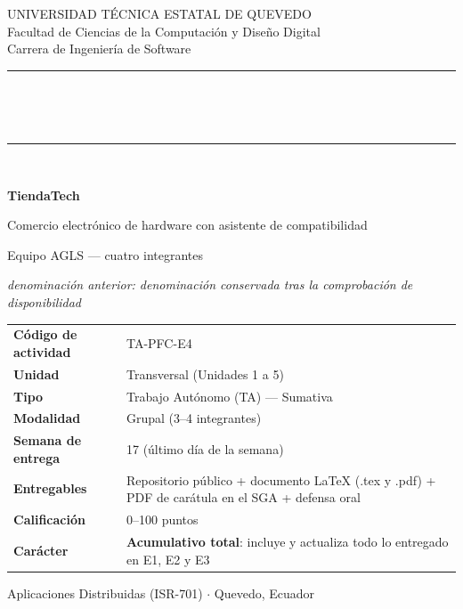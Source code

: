\documentclass[11pt,a4paper]{article}
\begin{document}
	
	\begin{titlepage}
		\centering
		\vspace*{0.9cm}
		{\small\color{uteqGray} UNIVERSIDAD TÉCNICA ESTATAL DE QUEVEDO\\ Facultad de Ciencias de la Computación y Diseño Digital\\ Carrera de Ingeniería de Software\par}
		\vspace{16pt}
		{\color{uteqBlue}\rule{\textwidth}{2pt}}\\[8pt]
		\colorbox{uteqBlue}{\parbox{0.96\textwidth}{\centering{}\vspace{5pt}}}\\[8pt]
		{\color{uteqBlue}\rule{\textwidth}{2pt}}\\[18pt]
		{\LARGE\bfseries\color{uteqBlue} TiendaTech\par}
		\vspace{5pt}
		{\large\color{uteqGray} Comercio electrónico de hardware con asistente de compatibilidad\par}
		\vspace{4pt}
		{\normalsize\color{uteqGray} Equipo AGLS --- cuatro integrantes\par}
		\vspace{3pt}
		{\footnotesize\color{uteqGray}\emph{denominación anterior: denominación conservada tras la comprobación de disponibilidad}\par}
		\vspace{22pt}
		\begin{minipage}{0.92\textwidth}
			\small
			\begin{tabular}{@{}p{4.3cm}p{9.6cm}@{}}
				\toprule
				\textbf{Código de actividad} & TA-PFC-E4 \\
				\textbf{Unidad} & Transversal (Unidades 1 a 5) \\
				\textbf{Tipo} & Trabajo Autónomo (TA) --- Sumativa \\
				\textbf{Modalidad} & Grupal (3--4 integrantes) \\
				\textbf{Semana de entrega} & 17 (último día de la semana) \\
				\textbf{Entregables} & Repositorio público + documento LaTeX (.tex y .pdf) + PDF de carátula en el SGA + defensa oral \\
				\textbf{Calificación} & 0--100 puntos \\
				\textbf{Carácter} & \textbf{Acumulativo total}: incluye y actualiza todo lo entregado en E1, E2 y E3 \\
				\bottomrule
			\end{tabular}
		\end{minipage}
		\vfill
		{\small\color{uteqGray} Aplicaciones Distribuidas (ISR-701) $\cdot$ Quevedo, Ecuador\par}
	\end{titlepage}
	
\end{document}
